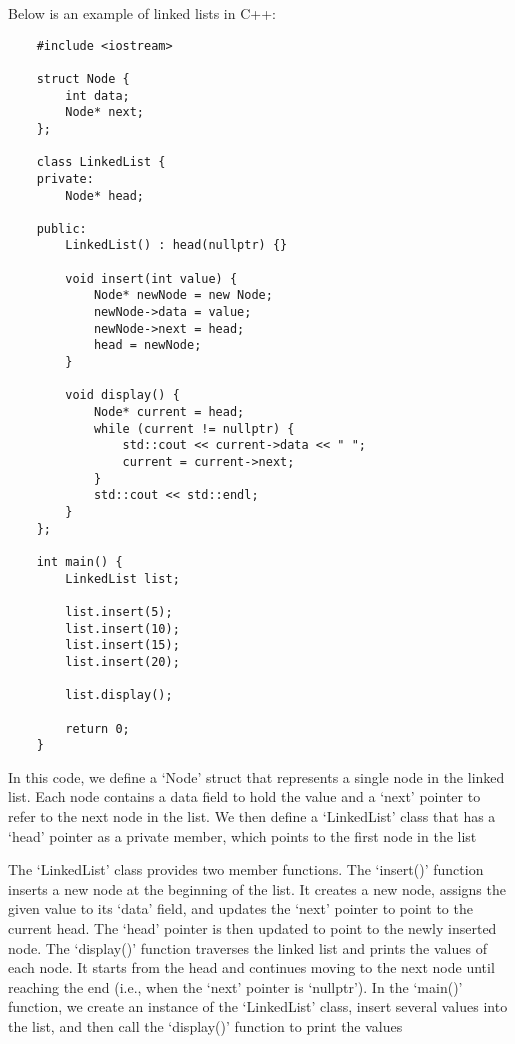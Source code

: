 \begin{solution}
    Below is an example of linked lists in C++:
    
    \horizontalline
    
    \begin{verbatim}   
    #include <iostream>
    
    struct Node {
        int data;
        Node* next;
    };
    
    class LinkedList {
    private:
        Node* head;
    
    public:
        LinkedList() : head(nullptr) {}
    
        void insert(int value) {
            Node* newNode = new Node;
            newNode->data = value;
            newNode->next = head;
            head = newNode;
        }
    
        void display() {
            Node* current = head;
            while (current != nullptr) {
                std::cout << current->data << " ";
                current = current->next;
            }
            std::cout << std::endl;
        }
    };
    
    int main() {
        LinkedList list;
    
        list.insert(5);
        list.insert(10);
        list.insert(15);
        list.insert(20);
    
        list.display();
    
        return 0;
    }
    \end{verbatim}
    \horizontalline
    
    In this code, we define a `Node' struct that represents a single node in the linked list. Each node contains a data field to hold the value and a `next' pointer to refer to the next node in the list. We then define a `LinkedList' class that has a `head' 
    pointer as a private member, which points to the first node in the list
    
    The `LinkedList' class provides two member functions. The `insert()' function inserts a new node at the beginning of the list. It creates a new node, assigns the given value to its `data' field, and updates the `next' pointer to point to the current 
    head. The `head' pointer is then updated to point to the newly inserted node. The `display()' function traverses the linked list and prints the values of each node. It starts from the head and continues moving to the next node until reaching the end 
    (i.e., when the `next' pointer is `nullptr'). In the `main()' function, we create an instance of the `LinkedList' class, insert several values into the list, and then call the `display()' function to print the values
    

\end{solution}
